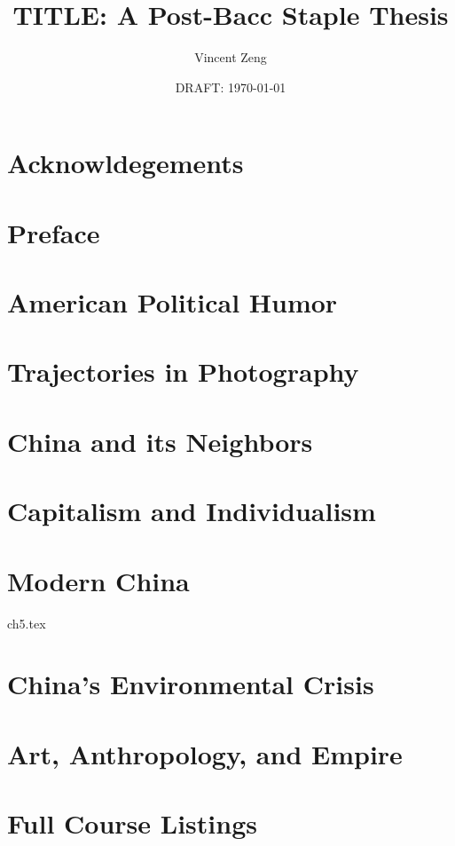 \documentclass{book}[10pt]
\title{TITLE: A Post-Bacc Staple Thesis}
\author{Vincent Zeng}
\date{DRAFT: \today}
\begin{document}
\maketitle

\frontmatter

\chapter{Acknowldegements}


\tableofcontents

\chapter{Preface}



\mainmatter

\chapter{American Political Humor}


\chapter{Trajectories in Photography}


\chapter{China and its Neighbors}


\chapter{Capitalism and Individualism}


\chapter{Modern China}
 {ch5.tex}

\chapter{China's Environmental Crisis}


\chapter{Art, Anthropology, and Empire}


\appendix

\chapter{Full Course Listings}


\printindex
\end{document}
